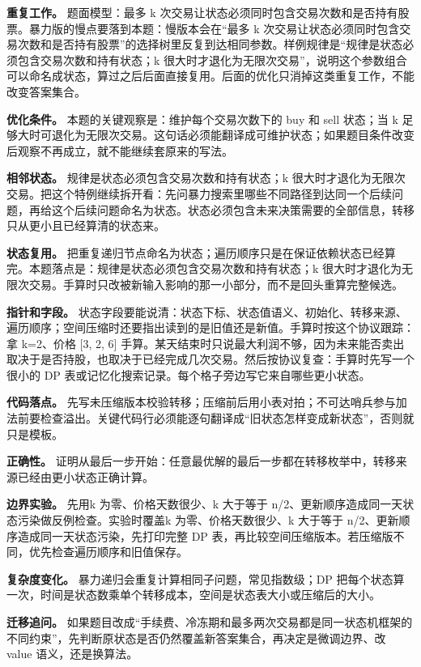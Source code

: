 \textbf{重复工作。} 题面模型：最多 k 次交易让状态必须同时包含交易次数和是否持有股票。暴力版的慢点要落到本题：慢版本会在“最多 k 次交易让状态必须同时包含交易次数和是否持有股票”的选择树里反复到达相同参数。样例规律是“规律是状态必须包含交易次数和持有状态；k 很大时才退化为无限次交易”，说明这个参数组合可以命名成状态，算过之后后面直接复用。后面的优化只消掉这类重复工作，不能改变答案集合。

\textbf{优化条件。} 本题的关键观察是：维护每个交易次数下的 buy 和 sell 状态；当 k 足够大时可退化为无限次交易。这句话必须能翻译成可维护状态；如果题目条件改变后观察不再成立，就不能继续套原来的写法。

\textbf{相邻状态。} 规律是状态必须包含交易次数和持有状态；k 很大时才退化为无限次交易。把这个特例继续拆开看：先问暴力搜索里哪些不同路径到达同一个后续问题，再给这个后续问题命名为状态。状态必须包含未来决策需要的全部信息，转移只从更小且已经算清的状态来。

\textbf{状态复用。} 把重复递归节点命名为状态；遍历顺序只是在保证依赖状态已经算完。本题落点是：规律是状态必须包含交易次数和持有状态；k 很大时才退化为无限次交易。手算时只改被新输入影响的那一小部分，而不是回头重算完整候选。

\textbf{指针和字段。} 状态字段要能说清：状态下标、状态值语义、初始化、转移来源、遍历顺序；空间压缩时还要指出读到的是旧值还是新值。手算时按这个协议跟踪：拿 k=2、价格 [3, 2, 6] 手算。某天结束时只说最大利润不够，因为未来能否卖出取决于是否持股，也取决于已经完成几次交易。然后按协议复查：手算时先写一个很小的 DP 表或记忆化搜索记录。每个格子旁边写它来自哪些更小状态。

\textbf{代码落点。} 先写未压缩版本校验转移；压缩前后用小表对拍；不可达哨兵参与加法前要检查溢出。关键代码行必须能逐句翻译成“旧状态怎样变成新状态”，否则就只是模板。

\textbf{正确性。} 证明从最后一步开始：任意最优解的最后一步都在转移枚举中，转移来源已经由更小状态正确计算。

\textbf{边界实验。} 先用k 为零、价格天数很少、k 大于等于 n/2、更新顺序造成同一天状态污染做反例检查。实验时覆盖k 为零、价格天数很少、k 大于等于 n/2、更新顺序造成同一天状态污染，先打印完整 DP 表，再比较空间压缩版本。若压缩版不同，优先检查遍历顺序和旧值保存。

\textbf{复杂度变化。} 暴力递归会重复计算相同子问题，常见指数级；DP 把每个状态算一次，时间是状态数乘单个转移成本，空间是状态表大小或压缩后的大小。

\textbf{迁移追问。} 如果题目改成“手续费、冷冻期和最多两次交易都是同一状态机框架的不同约束”，先判断原状态是否仍然覆盖新答案集合，再决定是微调边界、改 value 语义，还是换算法。

